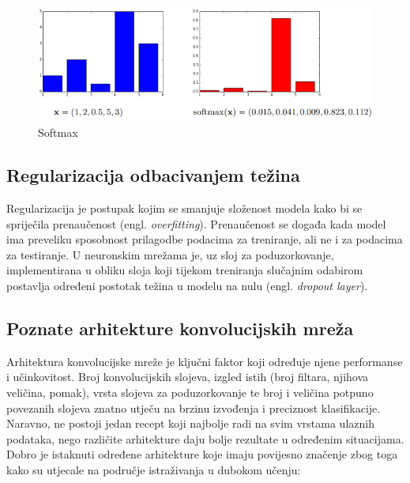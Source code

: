 \begin{figure}[htb]
    \centering
    \includegraphics[width=0.6\linewidth]{Chapters/neuronska_mreza/CNN/softmax.png} 
    \caption{Softmax \cite{snajder2023logreg}}
    \label{pic:softmax}
\end{figure}

\subsection{Regularizacija odbacivanjem težina}
Regularizacija je postupak kojim se smanjuje složenost modela kako bi se spriječila
prenaučenost (engl. \textit{overfitting}). Prenaučenost se događa kada model ima preveliku  
sposobnost prilagodbe podacima za treniranje, ali ne i za podacima za testiranje.
U neuronskim mrežama je, uz sloj za poduzorkovanje, implementirana u obliku sloja koji tijekom
treniranja slučajnim odabirom postavlja određeni postotak 
težina u modelu na nulu (engl. \textit{dropout layer}).

\subsection{Poznate arhitekture konvolucijskih mreža}
Arhitektura konvolucijske mreže je ključni faktor koji određuje njene performanse i
učinkovitost. Broj konvolucijskih slojeva, izgled istih (broj filtara, njihova veličina,
pomak), vrsta slojeva za poduzorkovanje te broj i veličina potpuno povezanih slojeva znatno
utječu na brzinu izvođenja i preciznost klasifikacije. Naravno, ne postoji jedan recept koji
najbolje radi na svim vrstama ulaznih podataka, nego različite arhitekture daju bolje rezultate
u određenim situacijama. Dobro je istaknuti određene arhitekture koje imaju povijesno značenje 
zbog toga kako su utjecale na područje istraživanja u dubokom učenju\cite{indian}:

